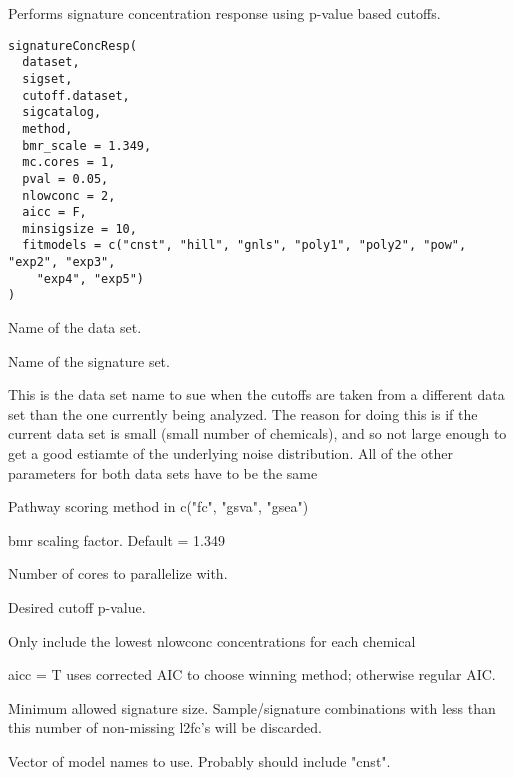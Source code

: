 \documentclass[letterpaper]{book}
\begin{document}
%
\begin{Description}\relax
Performs signature concentration response using p-value based cutoffs.
\end{Description}
%
\begin{Usage}
\begin{verbatim}
signatureConcResp(
  dataset,
  sigset,
  cutoff.dataset,
  sigcatalog,
  method,
  bmr_scale = 1.349,
  mc.cores = 1,
  pval = 0.05,
  nlowconc = 2,
  aicc = F,
  minsigsize = 10,
  fitmodels = c("cnst", "hill", "gnls", "poly1", "poly2", "pow", "exp2", "exp3",
    "exp4", "exp5")
)
\end{verbatim}
\end{Usage}
%
\begin{Arguments}
\begin{ldescription}
\item[\code{dataset}] Name of the data set.

\item[\code{sigset}] Name of the signature set.

\item[\code{cutoff.dataset}] This is the data set name to sue when the cutoffs are taken from a different data set than
the one currently being analyzed. The reason for doing this is if the current data set is small
(small number of chemicals), and so not large enough to get a good estiamte of the underlying
noise distribution. All of the other parameters for both data sets have to be the same

\item[\code{method}] Pathway scoring method in c("fc", "gsva", "gsea")

\item[\code{bmr\_scale}] bmr scaling factor. Default = 1.349

\item[\code{mc.cores}] Number of cores to parallelize with.

\item[\code{pval}] Desired cutoff p-value.

\item[\code{nlowconc}] Only include the lowest nlowconc concentrations for each chemical

\item[\code{aicc}] aicc = T uses corrected AIC to choose winning method; otherwise
regular AIC.

\item[\code{minsigsize}] Minimum allowed signature size. Sample/signature combinations
with less than this number of non-missing l2fc's will be discarded.

\item[\code{fitmodels}] Vector of model names to use. Probably should include "cnst".
\end{ldescription}
\end{Arguments}
\end{document}

